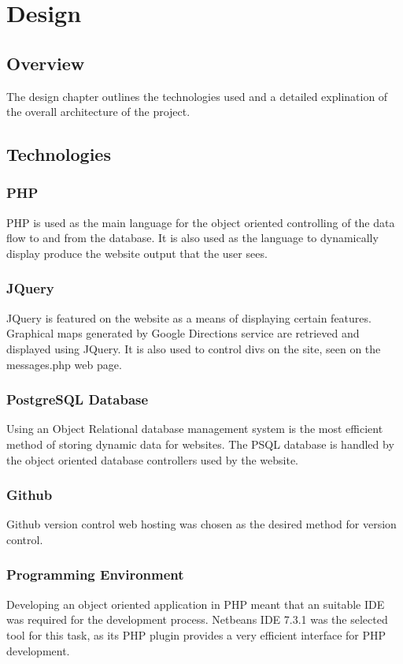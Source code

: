 \chapter{Design}

\section{Overview}
The design chapter outlines the technologies used and a detailed explination of the overall architecture of the project.

\section{Technologies}
	\subsection{PHP}
		PHP is used as the main language for the object oriented controlling of the data flow to and from the database. It is also used as the language to dynamically display produce the website output that the user sees.
		
	\subsection{JQuery}
		JQuery is featured on the website as a means of displaying certain features. Graphical maps generated by Google Directions \cite{google_directions_api} service are retrieved and displayed using JQuery. It is also used to control divs on the site, seen on the messages.php web page.
			
	\subsection{PostgreSQL Database}
	Using an Object Relational database management system is the most efficient method of storing dynamic data for websites. The PSQL database is handled by the object oriented database controllers used by the website.
	
	\subsection{Github}
		Github \cite{github} version control web hosting was chosen as the desired method for version control.
		
	\subsection{Programming Environment}
		Developing an object oriented application in PHP meant that an suitable IDE was required for the development process. Netbeans IDE 7.3.1 was the selected tool for this task, as its PHP plugin provides a very efficient interface for PHP development. 
		 
